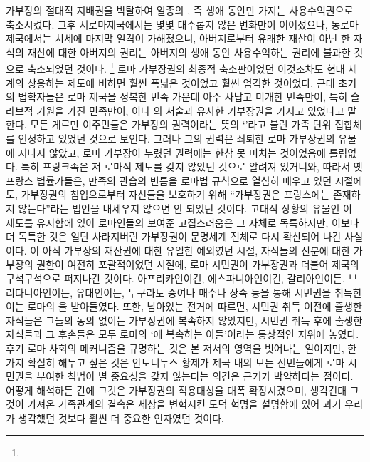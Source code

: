 가부장의 절대적 지배권을 박탈하여
일종의 ,
즉 생애 동안만 가지는 사용수익권으로 축소시켰다.
그후 서로마제국에서는 몇몇 대수롭지 않은 변화만이 이어졌으나,
동로마제국에서는  치세에 마지막 일격이 가해졌으니,
아버지로부터 유래한 재산이 아닌 한
자식의 재산에 대한 아버지의 권리는
아버지의 생애 동안 사용수익하는 권리에 불과한 것으로 축소되었던 것이다.%
\footnote{}
로마 가부장권의 최종적 축소판이었던 이것조차도
현대 세계의 상응하는 제도에 비하면 훨씬 폭넓은 것이었고
훨씬 엄격한 것이었다.
근대 초기의 법학자들은 로마 제국을 정복한 민족 가운데
아주 사납고 미개한 민족만이, 특히 슬라브적 기원을 가진 민족만이,
이나 의 서술과 유사한
가부장권을 가지고 있었다고 말한다.
모든 게르만 이주민들은 가부장의 권력이라는 뜻의 `'라고 불린
가족 단위 집합체를 인정하고 있었던 것으로 보인다.
그러나 그의 권력은 쇠퇴한 로마 가부장권의 유물에 지나지 않았고,
로마 가부장이 누렸던 권력에는 한참 못 미치는 것이었음에 틀림없다.
특히 프랑크족은 저 로마적 제도를 갖지 않았던 것으로 알려져 있거니와,
따라서 옛 프랑스 법률가들은,
만족의 관습의 빈틈을 로마법 규칙으로 열심히 메우고 있던 시절에도,
가부장권의 침입으로부터 자신들을 보호하기 위해
``가부장권은 프랑스에는 존재하지 않는다''라는 법언을 내세우지 않으면 안 되었던 것이다.
고대적 상황의 유물인 이 제도를 유지함에 있어 로마인들의 보여준 고집스러움은
그 자체로 독특하지만, 이보다 더 독특한 것은
일단 사라져버린 가부장권이 문명세계 전체로 다시 확산되어 나간 사실이다.
이 아직 가부장의 재산권에 대한 유일한 예외였던 시절,
자식들의 신분에 대한 가부장의 권한이 여전히 포괄적이었던 시절에,
로마 시민권이 가부장권과 더불어 제국의 구석구석으로 퍼져나간 것이다.
아프리카인이건, 에스파니아인이건, 갈리아인이든, 브리타니아인이든, 유대인이든,
누구라도 증여나 매수나 상속 등을 통해 시민권을 취득한 이는
로마의 을 받아들였다.
또한, 남아있는 전거에 따르면, 시민권 취득 이전에 출생한 자식들은
그들의 동의 없이는 가부장권에 복속하지 않았지만,
시민권 취득 후에 출생한 자식들과 그 후손들은 모두 로마의
`에 복속하는 아들'이라는 통상적인 지위에 놓였다.
후기 로마 사회의 메커니즘을 규명하는 것은 본 저서의 영역을 벗어나는 일이지만,
한 가지 확실히 해두고 싶은 것은
안토니누스  황제가 제국 내의 모든 신민들에게 로마 시민권을 부여한
칙법이 별 중요성을 갖지 않는다는 의견은 근거가 박약하다는 점이다.
어떻게 해석하든 간에
그것은 가부장권의 적용대상을 대폭 확장시켰으며,
생각건대 그것이 가져온 가족관계의 결속은
세상을 변혁시킨 도덕 혁명을 설명함에 있어
과거 우리가 생각했던 것보다 훨씬 더 중요한 인자였던 것이다.

